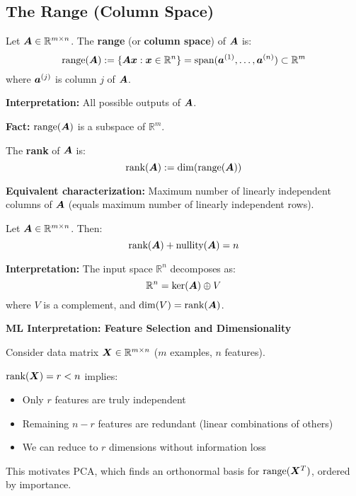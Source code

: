 \subsection{The Range (Column Space)}

\begin{definition}
    \label{def:range}
    Let $\bm{A} \in \mathbb{R}^{m \times n}$. The \textbf{range} (or \textbf{column space}) of $\bm{A}$ is:
    \[
        \text{range}(\bm{A}) := \{\bm{A}\bm{x} : \bm{x} \in \mathbb{R}^n\} = \text{span}(\bm{a}^{(1)}, \ldots, \bm{a}^{(n)}) \subset \mathbb{R}^m
    \]
    where $\bm{a}^{(j)}$ is column $j$ of $\bm{A}$.

    \textbf{Interpretation:} All possible outputs of $\bm{A}$.

    \textbf{Fact:} $\text{range}(\bm{A})$ is a subspace of $\mathbb{R}^m$.
\end{definition}

\begin{definition}[Rank]
    \label{def:rank}
    The \textbf{rank} of $\bm{A}$ is:
    \[
        \text{rank}(\bm{A}) := \dim(\text{range}(\bm{A}))
    \]

    \textbf{Equivalent characterization:} Maximum number of linearly independent columns of $\bm{A}$ (equals maximum number of linearly independent rows).
\end{definition}

\begin{theorem}
    \label{thm:rank-nullity}
    Let $\bm{A} \in \mathbb{R}^{m \times n}$. Then:
    \[
        \text{rank}(\bm{A}) + \text{nullity}(\bm{A}) = n
    \]

    \textbf{Interpretation:} The input space $\mathbb{R}^n$ decomposes as:
    \[
        \mathbb{R}^n = \ker(\bm{A}) \oplus V
    \]
    where $V$ is a complement, and $\dim(V) = \text{rank}(\bm{A})$.
\end{theorem}

\begin{mlbox}
    \textbf{ML Interpretation: Feature Selection and Dimensionality}

    Consider data matrix $\bm{X} \in \mathbb{R}^{m \times n}$ ($m$ examples, $n$
    features).

    $\text{rank}(\bm{X}) = r < n$ implies:
    \begin{itemize}
        \item Only $r$ features are truly independent
        \item Remaining $n - r$ features are redundant (linear combinations of others)
        \item We can reduce to $r$ dimensions without information loss
    \end{itemize}

    This motivates PCA, which finds an orthonormal basis for
    $\text{range}(\bm{X}^T)$, ordered by importance.
\end{mlbox}

